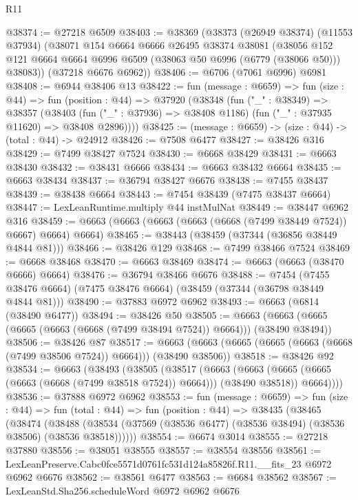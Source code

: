 \begin{lexlean}{R11}
\begin{coremodule}
@38374 := @27218 @6509
@38403 := @38369
    (@38373
      (@26949 @38374)
      (@11553 @37934)
      (@38071
        @154
        @6664
        @6666
        @26495
        @38374
        @38081
        (@38056 @152 @121 @6664 @6664 @6996 @6509 (@38063 @50 @6996 (@6779 (@38066 @50))) @38083))
      (@37218 @6676 @6962))
@38406 := @6706 (@7061 @6996) @6981
@38408 := @6944 @38406 @13
@38422 := fun (message : @6659) =>
  fun (size : @44) =>
  fun (position : @44) =>
  @37920
    (@38348
      (fun ("_" : @38349) =>
      @38357
        (@38403 (fun ("_" : @37936) => @38408 @1186) (fun ("_" : @37935 @11620) => @38408 @2896))))
@38425 := (message : @6659) -> (size : @44) -> (total : @44) -> @24912
@38426 := @7508 @6477
@38427 := @38426 @316
@38429 := @7499 @38427 @7524
@38430 := @6668 @38429
@38431 := @6663 @38430
@38432 := @38431 @6666
@38434 := @6663 @38432 @6664
@38435 := @6663 @38434
@38437 := @36794 @38427 @6676
@38438 := @7455 @38437
@38439 := @38438 @6664
@38443 := @7454 @38439 (@7475 @38437 @6664)
@38447 := LexLeanRuntime.multiply @44 instMulNat
@38449 := @38447 @6962 @316
@38459 := @6663 (@6663 (@6663 (@6663 (@6668 (@7499 @38449 @7524)) @6667) @6664) @6664)
@38465 := @38443 (@38459 (@37344 (@36856 @38449 @4844 @81)))
@38466 := @38426 @129
@38468 := @7499 @38466 @7524
@38469 := @6668 @38468
@38470 := @6663 @38469
@38474 := @6663 (@6663 (@38470 @6666) @6664)
@38476 := @36794 @38466 @6676
@38488 := @7454
    (@7455 @38476 @6664)
    (@7475 @38476 @6664)
    (@38459 (@37344 (@36798 @38449 @4844 @81)))
@38490 := @37883 @6972 @6962
@38493 := @6663 (@6814 (@38490 @6477))
@38494 := @38426 @50
@38505 := @6663 (@6663 (@6665 (@6665 (@6663 (@6668 (@7499 @38494 @7524)) @6664))) (@38490 @38494))
@38506 := @38426 @87
@38517 := @6663 (@6663 (@6665 (@6665 (@6663 (@6668 (@7499 @38506 @7524)) @6664))) (@38490 @38506))
@38518 := @38426 @92
@38534 := @6663
    (@38493
      (@38505
        (@38517
          (@6663
            (@6663 (@6665 (@6665 (@6663 (@6668 (@7499 @38518 @7524)) @6664))) (@38490 @38518))
            @6664))))
@38536 := @37888 @6972 @6962
@38553 := fun (message : @6659) =>
  fun (size : @44) =>
  fun (total : @44) =>
  fun (position : @44) =>
  @38435
    (@38465
      (@38474
        (@38488 (@38534 (@37569 (@38536 @6477) (@38536 @38494) (@38536 @38506) (@38536 @38518))))))
@38554 := @6674 @3014
@38555 := @27218 @37880
@38556 := @38051 @38555
@38557 := @38554 @38556
@38561 := LexLeanPreserve.Cabc0fce5571d0761fc531d124a85826f.R11.__fits_23 @6972 @6962 @6676
@38562 := @38561 @6477
@38563 := @6684 @38562
@38567 := LexLeanStd.Sha256.scheduleWord @6972 @6962 @6676

\end{coremodule}
\end{lexlean}
